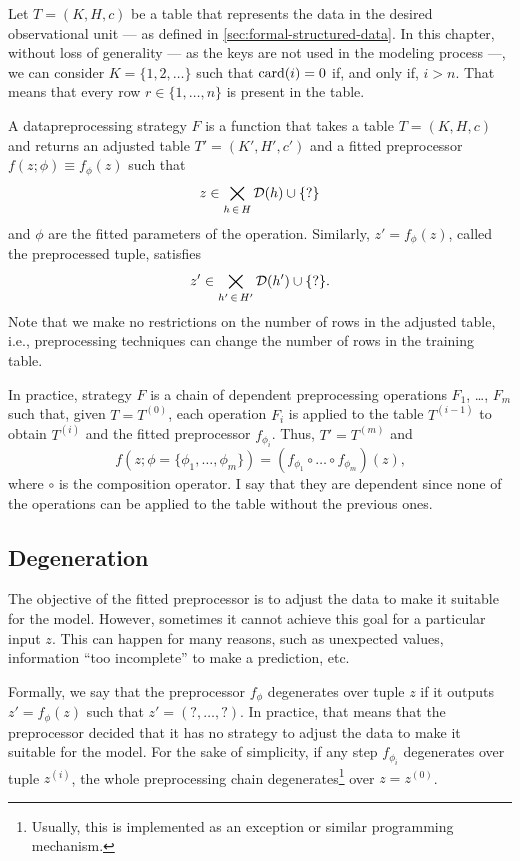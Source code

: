 Let $T = (K, H, c)$ be a table that represents the data in the desired observational unit
--- as defined in \cref{sec:formal-structured-data}.  In this chapter, without loss of
generality --- as the keys are not used in the modeling process ---, we can consider $K =
\{1, 2, \dots\}$ such that $\rowcard[i] = 0$ if, and only if, $i > n$.  That means that
every row $r \in \{1, \dots, n\}$ is present in the table.

A \gls{datapreprocessing} strategy $F$ is a function that takes a table $T = (K, H, c)$ and
returns an adjusted table $T' = (K', H', c')$ and a fitted \gls{preprocessor} $f(z; \phi)
\equiv f_\phi(z)$ such that $$z \in \bigtimes_{h\, \in\, H} \domainof{h} \cup \{?\}$$ and $\phi$ are
the fitted parameters of the operation.  Similarly, $z' = f_\phi(z)$, called the
preprocessed tuple, satisfies $$z' \in \bigtimes_{h'\, \in\, H'} \domainof{h'} \cup
\{?\}\text{.}$$ Note that we make no restrictions on the number of rows in the adjusted
table, i.e., preprocessing techniques can change the number of rows in the training table.

In practice, strategy $F$ is a chain of dependent preprocessing operations $F_1$, \dots,
$F_m$ such that, given $T = T^{(0)}$, each operation $F_i$ is applied to the table
$T^{(i-1)}$ to obtain $T^{(i)}$ and the fitted preprocessor $f_{\phi_i}$.  Thus, $T' =
T^{(m)}$ and $$f(z; \phi = \{\phi_1, \dots, \phi_m\}) = \left(f_{\phi_1} \circ \dots \circ
f_{\phi_m}\right)(z)\text{,}$$ where $\circ$ is the composition operator.  I say that
they are dependent since none of the operations can be applied to the table without the
previous ones.

\subsection{Degeneration}

The objective of the fitted \gls{preprocessor} is to adjust the data to make it suitable for the
model.  However, sometimes it cannot achieve this goal for a particular input $z$.  This
can happen for many reasons, such as unexpected values, information ``too incomplete'' to
make a prediction, etc.

Formally, we say that the preprocessor $f_\phi$ degenerates over tuple $z$ if it outputs
$z' = f_\phi(z)$ such that $z' = (?, \dots, ?)$.  In practice, that means that the
preprocessor decided that it has no strategy to adjust the data to make it suitable for
the model.  For the sake of simplicity, if any step $f_{\phi_i}$ degenerates over
tuple $z^{(i)}$, the whole preprocessing chain degenerates\footnote{Usually, this is
implemented as an exception or similar programming mechanism.} over $z = z^{(0)}$.

